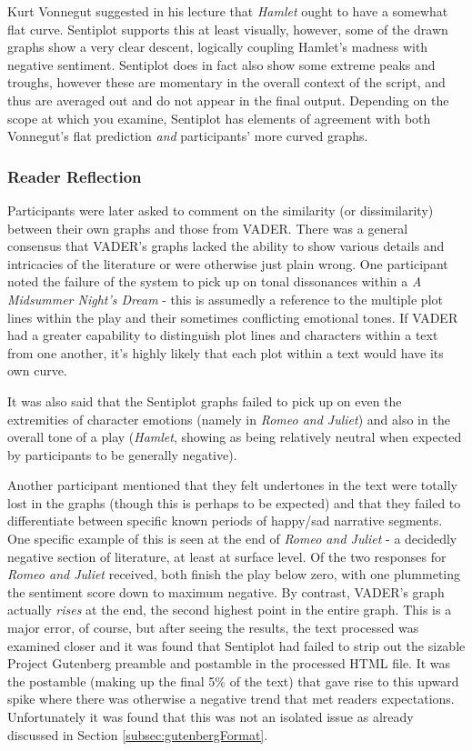 \documentclass{article}
\begin{document}
{            Kurt Vonnegut suggested in his lecture that \textit{Hamlet} ought to have a somewhat flat curve. Sentiplot supports this at least visually, however, some of the drawn graphs show a very clear descent, logically coupling Hamlet's madness with negative sentiment. Sentiplot does in fact also show some extreme peaks and troughs, however these are momentary in the overall context of the script, and thus are averaged out and do not appear in the final output. Depending on the scope at which you examine, Sentiplot has elements of agreement with both Vonnegut's flat prediction \textit{and} participants' more curved graphs.
			\subsubsection{Reader Reflection}
                Participants were later asked to comment on the similarity (or dissimilarity) between their own graphs and those from VADER. There was a general consensus that VADER's graphs lacked the ability to show various details and intricacies of the literature or were otherwise just plain wrong. 
                One participant noted the failure of the system to pick up on tonal dissonances within a \textit{A Midsummer Night's Dream} - this is assumedly a reference to the multiple plot lines within the play and their sometimes conflicting emotional tones. If VADER had a greater capability to distinguish plot lines and characters within a text from one another, it's highly likely that each plot within a text would have its own curve.
                
                It was also said that the Sentiplot graphs failed to pick up on even the extremities of character emotions (namely in \textit{Romeo and Juliet}) and also in the overall tone of a play (\textit{Hamlet}, showing as being relatively neutral when expected by participants to be generally negative).

                Another participant mentioned that they felt undertones in the text were totally lost in the graphs (though this is perhaps to be expected) and that they failed to differentiate between specific known periods of happy/sad narrative segments. One specific example of this is seen at the end of \textit{Romeo and Juliet} - a decidedly negative section of literature, at least at surface level. Of the two responses for \textit{Romeo and Juliet} received, both finish the play below zero, with one plummeting the sentiment score down to maximum negative. By contrast, VADER's graph actually \textit{rises} at the end, the second highest point in the entire graph. This is a major error, of course, but after seeing the results, the text processed was examined closer and it was found that Sentiplot had failed to strip out the sizable Project Gutenberg preamble and postamble in the processed HTML file. It was the postamble (making up the final 5\% of the text) that gave rise to this upward spike where there was otherwise a negative trend that met readers expectations. Unfortunately it was found that this was not an isolated issue as already discussed in Section \ref{subsec:gutenbergFormat}.
                
}
\end{document}
